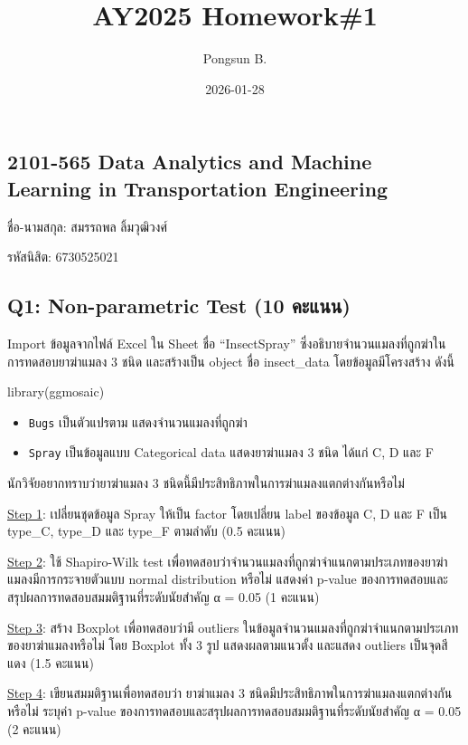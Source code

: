 \documentclass[
]{article}
\title{AY2025 Homework\#1}
\author{Pongsun B.}
\date{2026-01-28}
\begin{document}
\maketitle

\subsection{2101-565 Data Analytics and Machine Learning in
Transportation
Engineering}\label{data-analytics-and-machine-learning-in-transportation-engineering}

ชื่อ-นามสกุล: สมรรถพล ลิ้มวุฒิวงศ์

รหัสนิสิต: 6730525021

\subsection{Q1: Non-parametric Test (10
คะแนน)}\label{q1-non-parametric-test-10-uxe04uxe30uxe41uxe19uxe19}

Import ข้อมูลจากไฟล์ Excel ใน Sheet ชื่อ ``InsectSpray''
ซึ่งอธิบายจำนวนแมลงที่ถูกฆ่าในการทดสอบยาฆ่าแมลง 3 ชนิด และสร้างเป็น object ชื่อ
insect\_data โดยข้อมูลมีโครงสร้าง ดังนี้

library(ggmosaic)

\begin{itemize}
\item
  \texttt{Bugs} เป็นตัวแปรตาม แสดงจำนวนแมลงที่ถูกฆ่า
\item
  \texttt{Spray} เป็นข้อมูลแบบ Categorical data แสดงยาฆ่าแมลง 3 ชนิด ได้แก่ C,
  D และ F
\end{itemize}

นักวิจัยอยากทราบว่ายาฆ่าแมลง 3 ชนิดนี้มีประสิทธิภาพในการฆ่าแมลงแตกต่างกันหรือไม่

\ul{Step 1}: เปลี่ยนชุดข้อมูล Spray ให้เป็น factor โดยเปลี่ยน label ของข้อมูล C, D
และ F เป็น type\_C, type\_D และ type\_F ตามลำดับ (0.5 คะแนน)

\ul{Step 2}: ใช้ Shapiro-Wilk test
เพื่อทดสอบว่าจำนวนแมลงที่ถูกฆ่าจำแนกตามประเภทของยาฆ่าแมลงมีการกระจายตัวแบบ normal
distribution หรือไม่ แสดงค่า p-value
ของการทดสอบและสรุปผลการทดสอบสมมติฐานที่ระดับนัยสำคัญ α = 0.05 (1 คะแนน)

\ul{Step 3}: สร้าง Boxplot เพื่อทดสอบว่ามี outliers
ในข้อมูลจำนวนแมลงที่ถูกฆ่าจำแนกตามประเภทของยาฆ่าแมลงหรือไม่ โดย Boxplot ทั้ง 3 รูป
แสดงผลตามแนวตั้ง และแสดง outliers เป็นจุดสีแดง (1.5 คะแนน)

\ul{Step 4}: เขียนสมมติฐานเพื่อทดสอบว่า ยาฆ่าแมลง 3
ชนิดมีประสิทธิภาพในการฆ่าแมลงแตกต่างกันหรือไม่ ระบุค่า p-value
ของการทดสอบและสรุปผลการทดสอบสมมติฐานที่ระดับนัยสำคัญ α = 0.05 (2 คะแนน)
\end{document}
